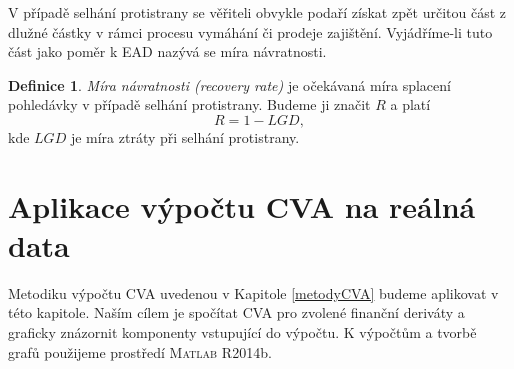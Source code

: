 \documentclass[a4paper,12pt]{report}
\theoremstyle{definition} \newtheorem{definice}[veta]{Definice}
\theoremstyle{remark}
\newcommand{\MATLAB}{\textsc{Matlab}\xspace}
\begin{document}
V případě selhání protistrany se věřiteli obvykle podaří získat zpět určitou část z dlužné částky v rámci procesu vymáhání či prodeje zajištění. 
Vyjádříme-li tuto část jako poměr k EAD nazývá se míra návratnosti.
\begin{definice}\label{rr_def}
\textit{Míra návratnosti (recovery rate)} je očekávaná míra splacení pohledávky v případě selhání protistrany.
Budeme ji značit $R$ a platí
\begin{equation}\label{recovery_rate}
R=1-LGD,
\end{equation}
kde $LGD$  je míra ztráty při selhání protistrany.
\end{definice}






\section{Aplikace výpočtu CVA na reálná data}\label{aplikaceCVA_kap}

Metodiku výpočtu CVA uvedenou v Kapitole \ref{metodyCVA} budeme aplikovat v této kapitole. 
Naším cílem je spočítat CVA pro zvolené finanční deriváty a graficky znázornit komponenty vstupující do výpočtu.
K výpočtům a tvorbě grafů použijeme prostředí \MATLAB R2014b.
\end{document}
